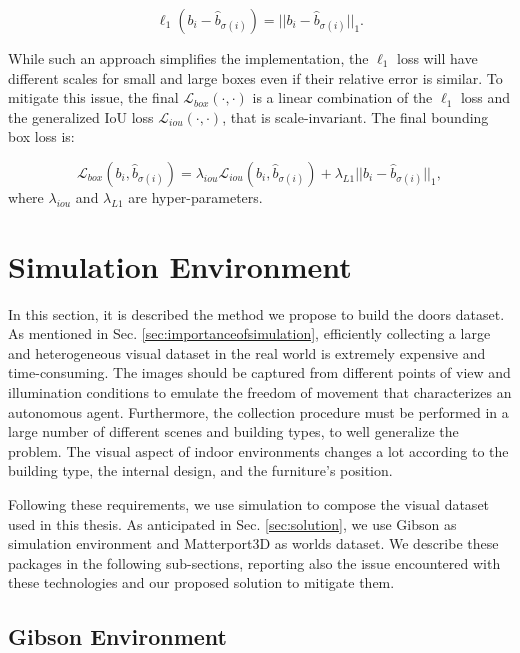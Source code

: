 \begin{equation}
\ell_1(b_i - \hat b_{\sigma(i)}) = ||b_i - \hat b_{\sigma(i)}||_1.
\end{equation}

While such an approach simplifies the implementation, the $\ell_1$ loss will have different scales for small and large boxes even if their relative error is similar. To mitigate this issue, the final $\mathcal{L}_{box}(\cdot, \cdot)$ is a linear combination of the $\ell_1$ loss and the generalized IoU loss \cite{generalizediou} $\mathcal{L}_{iou}(\cdot, \cdot)$, that is scale-invariant. The final bounding box loss is:

\begin{equation}
\mathcal{L}_{box}(b_i, \hat b_{\sigma(i)}) = \lambda_{iou}\mathcal{L}_{iou}(b_i, \hat b_{\sigma(i)}) + \lambda_{L1}||b_i - \hat b_{\sigma(i)}||_1,
\end{equation}
where $\lambda_{iou}$ and $\lambda_{L1}$ are hyper-parameters.

\section{Simulation Environment}

In this section, it is described the method we propose to build the doors dataset. As mentioned in Sec. \ref{sec:importanceofsimulation}, efficiently collecting a large and heterogeneous visual dataset in the real world is extremely expensive and time-consuming. The images should be captured from different points of view and illumination conditions to emulate the freedom of movement that characterizes an autonomous agent. Furthermore, the collection procedure must be performed in a large number of different scenes and building types, to well generalize the problem. The visual aspect of indoor environments changes a lot according to the building type, the internal design, and the furniture's position.

Following these requirements, we use simulation to compose the visual dataset used in this thesis. As anticipated in Sec. \ref{sec:solution}, we use Gibson \cite{gibson} as simulation environment and Matterport3D \cite{matterport} as worlds dataset. We describe these packages in the following sub-sections, reporting also the issue encountered with these technologies and our proposed solution to mitigate them.

\subsection{Gibson Environment}

